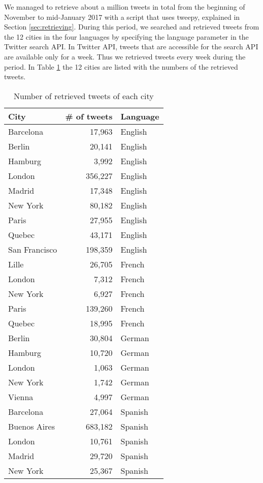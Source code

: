 We managed to retrieve about a million tweets in total from the beginning of November to mid-January 2017 with a script that uses tweepy, explained in Section \ref{sec:retrieving}.
During this period, we searched and retrieved tweets from the 12 cities in the four languages by specifying the language parameter in the Twitter search API.
In Twitter API, tweets that are accessible for the search API are available only for a week.
Thus we retrieved tweets every week during the period.
In Table \ref{tab:cities} the 12 cities are listed with the numbers of the retrieved tweets.

\begin{table}[ht]
	\caption{Number of retrieved tweets of each city}
	\centering
	\begin{tabular}{|l|r|l|} \hline
	City&\# of tweets&Language\\ \hline \hline
	Barcelona & 17,963 & English \\ \hline
	Berlin & 20,141 & English\\ \hline
	Hamburg & 3,992 & English\\ \hline
	London  & 356,227& English\\ \hline
	Madrid & 17,348 & English \\ \hline
	New York  & 80,182  & English\\ \hline
	Paris & 27,955 & English \\ \hline
	Quebec & 43,171 & English \\ \hline
	San Francisco & 198,359  & English\\ \hline
	Lille & 26,705  & French\\ \hline
	London & 7,312 & French \\ \hline
	New York & 6,927 & French \\ \hline
	Paris & 139,260 & French\\ \hline
	Quebec & 18,995 & French\\ \hline
	Berlin & 30,804 & German\\ \hline
	Hamburg & 10,720 & German\\ \hline
	London & 1,063 & German \\ \hline
	New York & 1,742& German\\ \hline
	Vienna & 4,997  & German\\ \hline
	Barcelona&27,064 & Spanish\\ \hline
	Buenos Aires&683,182  & Spanish\\ \hline
	London & 10,761 & Spanish\\ \hline
	Madrid& 29,720 & Spanish\\ \hline
	New York & 25,367 & Spanish\\ \hline
	\end{tabular}
	\label{tab:cities}
\end{table}

